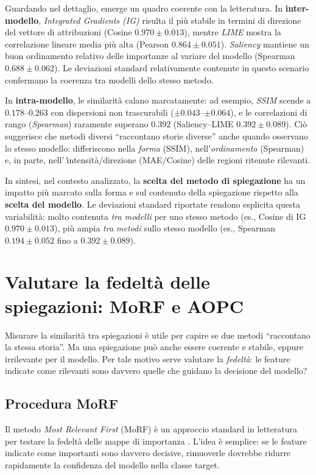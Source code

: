 \documentclass[12pt,a4paper,oneside]{report}
\numberwithin{figure}{chapter}
\numberwithin{table}{chapter}
\begin{document}
Guardando nel dettaglio, emerge un quadro coerente con la letteratura. In
\textbf{inter-modello}, \emph{Integrated Gradients (IG)} risulta il più stabile
in termini di direzione del vettore di attribuzioni (Cosine $0.970 \pm 0.013$),
mentre \emph{LIME} mostra la correlazione lineare media più alta (Pearson
$0.864 \pm 0.051$). \emph{Saliency} mantiene un buon ordinamento relativo delle
importanze al variare del modello (Spearman $0.688 \pm 0.062$). Le deviazioni
standard relativamente contenute in questo scenario confermano la coerenza tra
modelli dello stesso metodo.

In \textbf{intra-modello}, le similarità calano marcatamente: ad esempio,
\emph{SSIM} scende a $0.178$--$0.263$ con dispersioni non trascurabili ($\pm
      0.043$--$\pm 0.064$), e le correlazioni di rango (\emph{Spearman}) raramente
superano $0.392$ (Saliency--LIME $0.392 \pm 0.089$). Ciò suggerisce che metodi
diversi “raccontano storie diverse” anche quando osservano lo stesso modello:
differiscono nella \emph{forma} (SSIM), nell’\emph{ordinamento} (Spearman) e,
in parte, nell'\emph'{intensità/direzione} (MAE/Cosine) delle regioni ritenute
rilevanti.

In sintesi, nel contesto analizzato, la \textbf{scelta del metodo di
      spiegazione} ha un impatto più marcato sulla forma e sul contenuto della
spiegazione rispetto alla \textbf{scelta del modello}. Le deviazioni standard
riportate rendono esplicita questa variabilità: molto contenuta \emph{tra
      modelli} per uno stesso metodo (es., Cosine di IG $0.970 \pm 0.013$), più ampia
\emph{tra metodi} sullo stesso modello (es., Spearman $0.194 \pm 0.052$ fino a
$0.392 \pm 0.089$).

\chapter{Valutare la fedeltà delle spiegazioni: MoRF e AOPC}

Misurare la similarità tra spiegazioni è utile per capire se due metodi
``raccontano la stessa storia''. Ma una spiegazione può anche essere coerente e
stabile, eppure irrilevante per il modello. Per tale motivo serve valutare la
\emph{fedeltà}: le feature indicate come rilevanti sono davvero quelle che
guidano la decisione del modello?

\section{Procedura MoRF}
\label{sec:morf_aopc}
Il metodo \emph{Most Relevant First} (MoRF) è un approccio standard in
letteratura per testare la fedeltà delle mappe di importanza
\citep{samek2016evaluating,samek2017explainable}. L’idea è semplice: se le
feature indicate come importanti sono davvero decisive, rimuoverle dovrebbe
ridurre rapidamente la confidenza del modello nella classe target.
\end{document}
